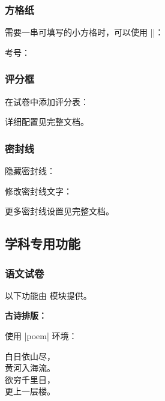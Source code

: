 \subsubsection{方格纸}

需要一串可填写的小方格时，可以使用 |\examsquare|：

\begin{latexcode}
  考号：
\end{latexcode}

\subsubsection{评分框}

在试卷中添加评分表：

\begin{latexcode}
  \scoringbox
\end{latexcode}

详细配置见完整文档。

\subsubsection{密封线}

隐藏密封线：

\begin{latexcode}
\end{latexcode}

修改密封线文字：

\begin{latexcode}
\end{latexcode}

更多密封线设置见完整文档。


\subsection{学科专用功能}

\subsubsection{语文试卷}

以下功能由  模块提供。

\textbf{古诗排版：}

使用 |poem| 环境：

\begin{latexcode}
  \begin{poem}
    白日依山尽，\\
    黄河入海流。\\
    欲穷千里目，\\
    更上一层楼。
  \end{poem}
\end{latexcode}

